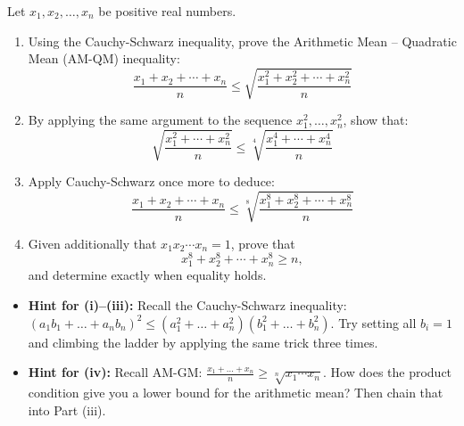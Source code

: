 \begin{problem}
Let $x_1, x_2, \ldots, x_n$ be positive real numbers.

\begin{enumerate}[leftmargin=*]
    \item[\textbf{(i)}] Using the Cauchy-Schwarz inequality, prove the Arithmetic Mean -- Quadratic Mean (AM-QM) inequality:
    \[
        \frac{x_1 + x_2 + \cdots + x_n}{n} \leq \sqrt{\frac{x_1^2 + x_2^2 + \cdots + x_n^2}{n}}
    \]

    \item[\textbf{(ii)}] By applying the same argument to the sequence $x_1^2, \ldots, x_n^2$, show that:
    \[
        \sqrt{\frac{x_1^2 + \cdots + x_n^2}{n}} \leq \sqrt[4]{\frac{x_1^4 + \cdots + x_n^4}{n}}
    \]

    \item[\textbf{(iii)}] Apply Cauchy-Schwarz once more to deduce:
    \[
        \frac{x_1 + x_2 + \cdots + x_n}{n} \leq \sqrt[8]{\frac{x_1^8 + x_2^8 + \cdots + x_n^8}{n}}
    \]

    \item[\textbf{(iv)}] Given additionally that $x_1 x_2 \cdots x_n = 1$, prove that
    \[
        x_1^8 + x_2^8 + \cdots + x_n^8 \geq n,
    \]
    and determine exactly when equality holds.
\end{enumerate}
\end{problem}

\begin{hint}
\begin{itemize}[leftmargin=*]
    \item \textbf{Hint for (i)--(iii):} Recall the Cauchy-Schwarz inequality: $(a_1b_1 + \dots + a_nb_n)^2 \le (a_1^2 + \dots + a_n^2)(b_1^2 + \dots + b_n^2)$. Try setting all $b_i = 1$ and climbing the ladder by applying the same trick three times.
    \item \textbf{Hint for (iv):} Recall AM-GM: $\frac{x_1 + \dots + x_n}{n} \ge \sqrt[n]{x_1 \cdots x_n}$. How does the product condition give you a lower bound for the arithmetic mean? Then chain that into Part (iii).
\end{itemize}
\end{hint}

